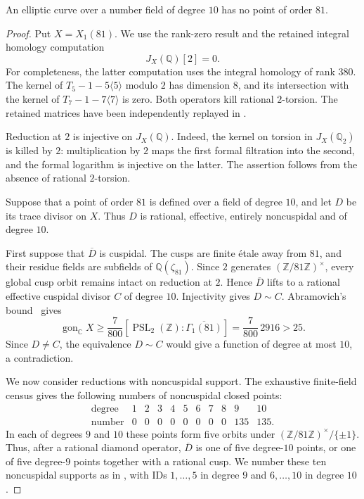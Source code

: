 \begin{proposition}\label{prop:decic-no81}
An elliptic curve over a number field of degree $10$ has no point of
order $81$.
\end{proposition}
\begin{proof}
Put $X=X_1(81)$. We use the rank-zero result
\cite[Theorem~3.1]{DEHMZ} and the retained integral homology computation
\[
 J_X(\mathbb Q)[2]=0.
\]
For completeness, the latter computation uses the integral homology of
rank $380$. The kernel of $T_5-1-5\langle5\rangle$ modulo $2$ has
dimension $8$, and its intersection with the kernel of
$T_7-1-7\langle7\rangle$ is zero. Both operators kill rational
$2$-torsion. The retained matrices have been independently replayed in
.

Reduction at $2$ is injective on $J_X(\mathbb Q)$. Indeed, the kernel
on torsion in $J_X(\mathbb Q_2)$ is killed by $2$: multiplication by $2$
maps the first formal filtration into the second, and the formal
logarithm is injective on the latter. The assertion follows from the
absence of rational $2$-torsion.

Suppose that a point of order $81$ is defined over a field of degree
$10$, and let $D$ be its trace divisor on $X$. Thus $D$ is rational,
effective, entirely noncuspidal and of degree $10$.

First suppose that $\overline D$ is cuspidal. The cusps are finite
\'{e}tale away from $81$, and their residue fields are subfields of
$\mathbb Q(\zeta_{81})$. Since $2$ generates
$(\mathbb Z/81\mathbb Z)^\times$, every global cusp orbit remains
intact on reduction at $2$. Hence $\overline D$ lifts to a rational
effective cuspidal divisor $C$ of degree $10$. Injectivity gives
$D\sim C$. Abramovich's bound~\cite{Abramovich} gives
\[
 \operatorname{gon}_{\mathbb C}X
 \geq \frac7{800}[\operatorname{PSL}_2(\mathbb Z):\overline{\Gamma_1(81)}]
 =\frac7{800}\,2916>25.
\]
Since $D\ne C$, the equivalence $D\sim C$ would give a function of
degree at most $10$, a contradiction.

We now consider reductions with noncuspidal support. The exhaustive
finite-field census gives the following numbers of noncuspidal closed
points:
\[
\begin{array}{c|rrrrrrrrrr}
 \text{degree}&1&2&3&4&5&6&7&8&9&10\\ \hline
 \text{number}&0&0&0&0&0&0&0&0&135&135.
\end{array}
\]
In each of degrees $9$ and $10$ these points form five orbits under
$(\mathbb Z/81\mathbb Z)^\times/\{\pm1\}$. Thus, after a rational
diamond operator, $\overline D$ is one of five degree-$10$ points, or
one of five degree-$9$ points together with a rational cusp. We number
these ten noncuspidal supports as in , with IDs
$1,\ldots,5$ in degree $9$ and $6,\ldots,10$ in degree $10$.


\end{proof}
